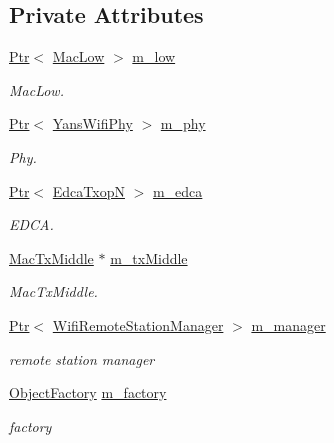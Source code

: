 \subsection*{Private Attributes}
\begin{DoxyCompactItemize}
\item 
\hyperlink{classns3_1_1Ptr}{Ptr}$<$ \hyperlink{classns3_1_1MacLow}{Mac\+Low} $>$ \hyperlink{classAmpduAggregationTest_a65f2d8fbd8b46a92ace2c371d2a091d9}{m\+\_\+low}
\begin{DoxyCompactList}\small\item\em Mac\+Low. \end{DoxyCompactList}\item 
\hyperlink{classns3_1_1Ptr}{Ptr}$<$ \hyperlink{classns3_1_1YansWifiPhy}{Yans\+Wifi\+Phy} $>$ \hyperlink{classAmpduAggregationTest_a220a24ff11749ab912f7c13b50132b5c}{m\+\_\+phy}
\begin{DoxyCompactList}\small\item\em Phy. \end{DoxyCompactList}\item 
\hyperlink{classns3_1_1Ptr}{Ptr}$<$ \hyperlink{classns3_1_1EdcaTxopN}{Edca\+TxopN} $>$ \hyperlink{classAmpduAggregationTest_aa073b38b49ac92944de917cd25fe46f4}{m\+\_\+edca}
\begin{DoxyCompactList}\small\item\em E\+D\+CA. \end{DoxyCompactList}\item 
\hyperlink{classns3_1_1MacTxMiddle}{Mac\+Tx\+Middle} $\ast$ \hyperlink{classAmpduAggregationTest_a69145cfecbe5625743bb6165b99e5069}{m\+\_\+tx\+Middle}
\begin{DoxyCompactList}\small\item\em Mac\+Tx\+Middle. \end{DoxyCompactList}\item 
\hyperlink{classns3_1_1Ptr}{Ptr}$<$ \hyperlink{classns3_1_1WifiRemoteStationManager}{Wifi\+Remote\+Station\+Manager} $>$ \hyperlink{classAmpduAggregationTest_abd162c86cd5eb8e4146bcacd20ccc312}{m\+\_\+manager}
\begin{DoxyCompactList}\small\item\em remote station manager \end{DoxyCompactList}\item 
\hyperlink{classns3_1_1ObjectFactory}{Object\+Factory} \hyperlink{classAmpduAggregationTest_a3efaaca4bf81a378cb170add8bf52b26}{m\+\_\+factory}
\begin{DoxyCompactList}\small\item\em factory \end{DoxyCompactList}\item 

\end{DoxyCompactItemize}

